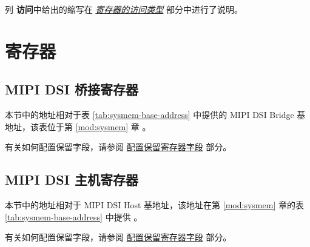 \documentclass[main\_\_CN.tex]{subfiles}
\begin{document}
列 \textbf{访问}中给出的缩写在 \hyperref[glossary-access-types]{\textit{寄存器的访问类型}} 部分中进行了说明。







\newpage

\section{寄存器}

\subsection{MIPI DSI 桥接寄存器}
本节中的地址相对于表 \ref{tab:sysmem-base-address} 中提供的 MIPI DSI Bridge 基地址，该表位于第 \ref{mod:sysmem} 章 \textit{}。

有关如何配置保留字段，请参阅 \hyperref[programming-reserved-field]{配置保留寄存器字段} 部分。



\subsection{MIPI DSI 主机寄存器}
本节中的地址相对于 MIPI DSI Host 基地址，该地址在第 \ref{mod:sysmem} 章的表 \ref{tab:sysmem-base-address} 中提供 \textit{}。

有关如何配置保留字段，请参阅 \hyperref[programming-reserved-field]{配置保留寄存器字段} 部分。


\end{document}
